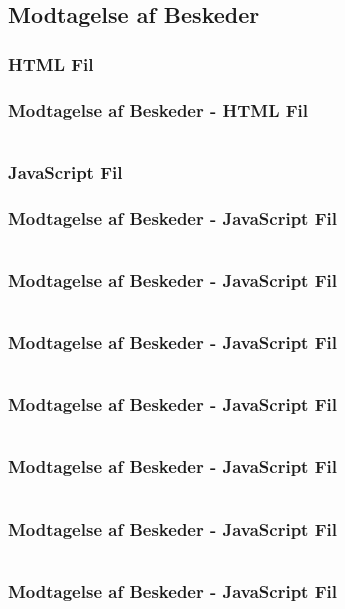 \subsection{Modtagelse af Beskeder}
\subsubsection{HTML Fil}
\begin{frame}
    \frametitle{Modtagelse af Beskeder - HTML Fil}
    \vspace{-1mm}
    \inputminted[fontsize=\footnotesize,breaklines=true,highlightlines={11}]{html}{../src/frontend/part4_recv/index.html}
\end{frame}
\subsubsection{JavaScript Fil}
\begin{frame}
    \frametitle{Modtagelse af Beskeder - JavaScript Fil}
    \vspace{-1mm}
    \inputminted[fontsize=\footnotesize,highlightlines={}]{javascript}{../src/frontend/part4_recv/logic.js}
\end{frame}
\begin{frame}
    \frametitle{Modtagelse af Beskeder - JavaScript Fil}
    \vspace{-1mm}
    \inputminted[fontsize=\footnotesize,highlightlines={1}]{javascript}{../src/frontend/part4_recv/logic.js}
\end{frame}
\begin{frame}
    \frametitle{Modtagelse af Beskeder - JavaScript Fil}
    \vspace{-1mm}
    \inputminted[fontsize=\footnotesize,highlightlines={2}]{javascript}{../src/frontend/part4_recv/logic.js}
\end{frame}
\begin{frame}
    \frametitle{Modtagelse af Beskeder - JavaScript Fil}
    \vspace{-1mm}
    \inputminted[fontsize=\footnotesize,highlightlines={5}]{javascript}{../src/frontend/part4_recv/logic.js}
\end{frame}
\begin{frame}
    \frametitle{Modtagelse af Beskeder - JavaScript Fil}
    \vspace{-1mm}
    \inputminted[fontsize=\footnotesize,highlightlines={6,13}]{javascript}{../src/frontend/part4_recv/logic.js}
\end{frame}
\begin{frame}
    \frametitle{Modtagelse af Beskeder - JavaScript Fil}
    \vspace{-1mm}
    \inputminted[fontsize=\footnotesize,highlightlines={7,9}]{javascript}{../src/frontend/part4_recv/logic.js}
\end{frame}
\begin{frame}
    \frametitle{Modtagelse af Beskeder - JavaScript Fil}
    \vspace{-1mm}
    \inputminted[fontsize=\footnotesize,highlightlines={10}]{javascript}{../src/frontend/part4_recv/logic.js}
\end{frame}

